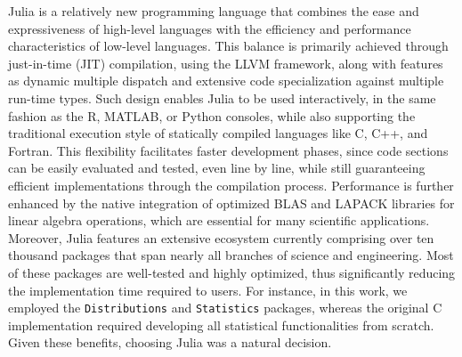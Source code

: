 \documentclass[12pt,	%
	a4paper,		%
	twoside,		%
	openright,		%
	titlepage,%
	]{book}
\theoremstyle{definition}
\let\cite\citep
\newcommand{\mjline}[1]{\texttt{#1}}
\begin{document}
Julia is a relatively new programming language that combines the ease and expressiveness of high-level languages with the efficiency and performance characteristics of low-level languages. This balance is primarily achieved through just-in-time (JIT) compilation, using the LLVM framework, along with features as dynamic multiple dispatch and extensive code specialization against multiple run-time types.
Such design enables Julia to be used interactively, in the same fashion as the R, MATLAB, or Python consoles, while also supporting the traditional execution style of statically compiled languages like C, C++, and Fortran. This flexibility facilitates faster development phases, since code sections can be easily evaluated and tested, even line by line, while still guaranteeing efficient implementations through the compilation process. Performance is further enhanced by the native integration of optimized BLAS \cite{blas} and LAPACK libraries for linear algebra operations, which are essential for many scientific applications.
Moreover, Julia features an extensive ecosystem currently comprising over ten thousand packages that span nearly all branches of science and engineering. Most of these packages are well-tested and highly optimized, thus significantly reducing the implementation time required to users. For instance, in this work, we employed the \mjline{Distributions} \cite{JSSv098i16} \cite{Distributions.jl-2019} and \mjline{Statistics} packages, whereas the original C implementation required developing all statistical functionalities from scratch. Given these benefits, choosing Julia was a natural decision.
\end{document}

